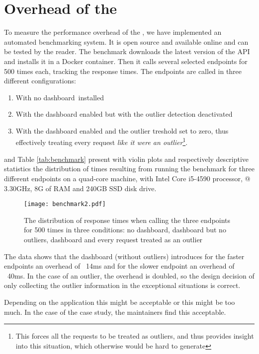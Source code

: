   
\newpage
\section{Overhead of the \tool}
\label{sec:overhead}

To measure the performance overhead of the \tool, we have implemented an automated benchmarking system. It is open source and available online and can be tested by the reader. The benchmark downloads the latest version of the \zee API and installs it in a Docker container. Then it calls several selected endpoints for 500 times each, tracking the response times. The endpoints are called in three different configurations: 

	\begin{enumerate}
		\item With no dashboard installed
		\item With the dashboard enabled but with the outlier detection deactivated
		\item With the dashboard enabled and the outlier treshold set to zero, thus effectively treating every request {\em like it were an outlier}\footnote{This forces all the requests to be treated as outliers, and thus provides insight into this situation, which otherwise would be hard to generate}.
	\end{enumerate}



 and Table \ref{tab:benchmark} present with violin plots and respectively descriptive statistics the distribution of times resulting from running the benchmark for three different endpoints on a quad-core machine, with Intel Core i5-4590 processor, @ 3.30GHz, 8G of RAM and 240GB SSD disk drive.


\begin{figure}[h!]
	\centering
	\texttt{[image: benchmark2.pdf]}
	\caption{The distribution of response times when calling the three endpoints for 500 times in three conditions: no dashboard, dashboard but no outliers, dashboard and every request treated as an outlier}
	\label{fig:bench}
\end{figure}




	The data shows that the dashboard (without outliers) introduces for the faster endpoints an overhead of ~14ms and for the slower endpoint an overhead of ~40ms. 
	In the case of an outlier, the overhead is doubled, so the design decision of only collecting the outlier information in the exceptional situations is correct.

	Depending on the application this might be acceptable or this might be too much. In the case of the \zee case study, the maintainers find this acceptable. 



  